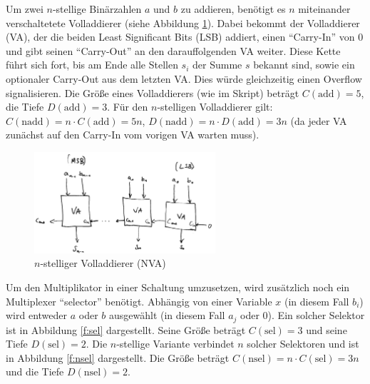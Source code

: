 \documentclass{article}
\begin{document}
    Um zwei $n$-stellige Binärzahlen $a$ und $b$ zu addieren, benötigt es $n$ miteinander verschaltetete Volladdierer (siehe Abbildung \ref{f:naddierer}). Dabei bekommt der Volladdierer (VA), der die beiden Least Significant Bits (LSB) addiert, einen "`Carry-In"' von 0 und gibt seinen "`Carry-Out"' an den darauffolgenden VA weiter. Diese Kette führt sich fort, bis am Ende alle Stellen $s_i$ der Summe $s$ bekannt sind, sowie ein optionaler Carry-Out aus dem letzten VA. Dies würde gleichzeitig einen Overflow signalisieren. Die Größe eines Volladdierers (wie im Skript) beträgt $C(\text{add}) = 5$, die Tiefe $D(\text{add}) = 3$. Für den $n$-stelligen Volladdierer gilt: $C(\text{nadd}) = n\cdot C(\text{add}) = 5n$, $D(\text{nadd}) = n \cdot D(\text{add}) = 3n$ (da jeder VA zunächst auf den Carry-In vom vorigen VA warten muss).
    \begin{figure}[h]
        \centering
        \includegraphics[width=0.6\textwidth]{naddierer.jpeg}
        \caption{$n$-stelliger Volladdierer (NVA)}
        \label{f:naddierer}
    \end{figure}

    Um den Multiplikator in einer Schaltung umzusetzen, wird zusätzlich noch ein Multiplexer "`selector"' benötigt. Abhängig von einer Variable $x$ (in diesem Fall $b_i$) wird entweder $a$ oder $b$ ausgewählt (in diesem Fall $a_j$ oder 0). Ein solcher Selektor ist in Abbildung \ref{f:sel} dargestellt. Seine Größe beträgt $C(\text{sel}) = 3$ und seine Tiefe $D(\text{sel}) = 2$. Die $n$-stellige Variante verbindet $n$ solcher Selektoren und ist in Abbildung \ref{f:nsel} dargestellt. Die Größe beträgt $C(\text{nsel}) = n \cdot C(\text{sel}) = 3n$ und die Tiefe $D(\text{nsel}) = 2$. 
\end{document}
